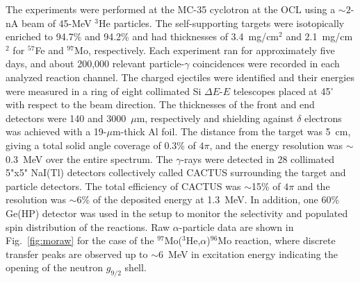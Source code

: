 \begin{multicols}{2}
The experiments were performed at the MC-35 cyclotron at the OCL using a 
$\sim 2$-nA beam of 45-MeV $^3$He particles. The self-supporting targets were 
isotopically enriched to 94.7\% and 94.2\% and had thicknesses of 3.4~mg/cm$^2$
and 2.1~mg/cm$^2$ for $^{57}$Fe and $^{97}$Mo, respectively. Each experiment 
ran for approximately five days, and about 200,000 relevant particle-$\gamma$ 
coincidences were recorded in each analyzed reaction channel. The charged 
ejectiles were identified and their energies were measured in a ring of eight 
collimated Si $\Delta E$-$E$ telescopes placed at 45$^\circ$ with respect to 
the beam direction. The thicknesses of the front and end detectors were 140 and
3000~$\mu$m, respectively and shielding against $\delta$ electrons was achieved
with a 19-$\mu$m-thick Al foil. The distance from the target was 5~cm, giving a
total solid angle coverage of 0.3\% of $4\pi$, and the energy resolution was 
$\sim$0.3~MeV over the entire spectrum. The $\gamma$-rays were detected in 28 
collimated 5"x5" NaI(Tl) detectors collectively called CACTUS \cite{GA90} 
surrounding the target and particle detectors. The total efficiency of CACTUS 
was $\sim$15\% of $4\pi$ and the resolution was $\sim$6\% of the deposited 
energy at 1.3~MeV\@. In addition, one 60\% Ge(HP) detector was used in the 
setup to monitor the selectivity and populated spin distribution of the 
reactions. Raw $\alpha$-particle data are shown in Fig.\ \ref{fig:moraw} for 
the case of the $^{97}$Mo($^3$He,$\alpha$)$^{96}$Mo reaction, where discrete
transfer peaks are observed up to $\sim$6~MeV in excitation energy indicating 
the opening of the neutron $g_{9/2}$ shell.


\end{multicols}
